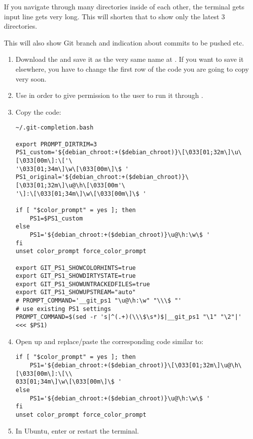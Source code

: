 
If you navigate through many directories inside of each other, the terminal gets input line gets very long. This will shorten that to show only the latest 3 directories.

This will also show Git branch and indication about commits to be pushed etc.

\begin{enumerate}
    \item Download the  and save it as the very same name at . If you want to save it elsewhere, you have to change the first row of the code you are going to copy very soon.
    
    \item Use  in order to give permission to the user to run it through .
    
    \item Copy the code:
    
    \begin{verbatim}
~/.git-completion.bash

export PROMPT_DIRTRIM=3
PS1_custom='${debian_chroot:+($debian_chroot)}\[\033[01;32m\]\u\[\033[00m\]:\['\
'\033[01;34m\]\w\[\033[00m\]\$ '
PS1_original='${debian_chroot:+($debian_chroot)}\[\033[01;32m\]\u@\h\[\033[00m'\
'\]:\[\033[01;34m\]\w\[\033[00m\]\$ '

if [ "$color_prompt" = yes ]; then
    PS1=$PS1_custom
else
    PS1='${debian_chroot:+($debian_chroot)}\u@\h:\w\$ '
fi
unset color_prompt force_color_prompt

export GIT_PS1_SHOWCOLORHINTS=true
export GIT_PS1_SHOWDIRTYSTATE=true
export GIT_PS1_SHOWUNTRACKEDFILES=true
export GIT_PS1_SHOWUPSTREAM="auto" 
# PROMPT_COMMAND='__git_ps1 "\u@\h:\w" "\\\$ "'
# use existing PS1 settings
PROMPT_COMMAND=$(sed -r 's|^(.+)(\\\$\s*)$|__git_ps1 "\1" "\2"|' <<< $PS1)
    \end{verbatim}

    \item Open up  and replace/paste the corresponding code similar to:

    \begin{verbatim}
if [ "$color_prompt" = yes ]; then
    PS1='${debian_chroot:+($debian_chroot)}\[\033[01;32m\]\u@\h\[\033[00m\]:\[\\
033[01;34m\]\w\[\033[00m\]\$ '
else
    PS1='${debian_chroot:+($debian_chroot)}\u@\h:\w\$ '
fi
unset color_prompt force_color_prompt
    \end{verbatim}

    \item In Ubuntu, enter  or restart the terminal.
\end{enumerate}